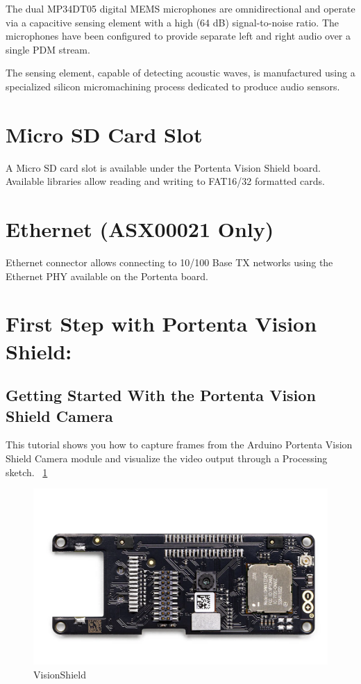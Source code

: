 	The dual MP34DT05 digital MEMS microphones are omnidirectional and operate via a capacitive sensing element with a high (64 dB) signal-to-noise ratio. The microphones have been configured to provide separate left and right audio over a single PDM stream.
	
	The sensing element, capable of detecting acoustic waves, is manufactured using a specialized silicon micromachining process dedicated to produce audio sensors.
	
	\section{Micro SD Card Slot}
	
	A Micro SD card slot is available under the Portenta Vision Shield board. Available libraries allow reading and writing to FAT16/32 formatted cards.
	
	\section{Ethernet (ASX00021 Only)}
	
	Ethernet connector allows connecting to 10/100 Base TX networks using the Ethernet PHY available on the Portenta board.
	
\section{First Step with Portenta Vision Shield:}

\subsection{Getting Started With the Portenta Vision Shield Camera}
This tutorial shows you how to capture frames from the Arduino Portenta Vision Shield Camera module and visualize the video output through a Processing sketch. ~\ref{VisionShield} \cite{portentaVisionShieldCamera:2024}
	\begin{figure}
		\begin{center}
			\includegraphics[width=0.7\linewidth]{Images/VisionShield/VisionShield.png}
			\caption{VisionShield}
			\label{VisionShield}
		\end{center}
	\end{figure}

